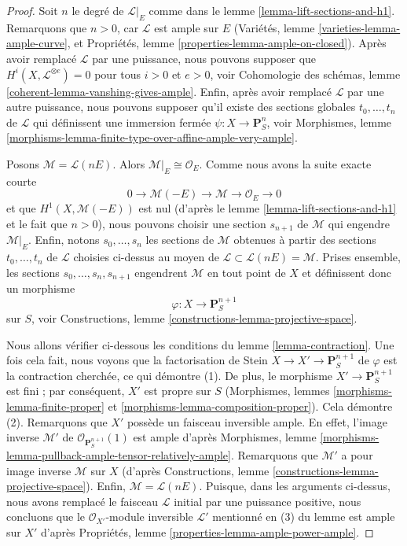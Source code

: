 \begin{proof} Soit $n$ le degré de $\mathcal{L}|_E$ comme dans le lemme \ref{lemma-lift-sections-and-h1}. Remarquons que $n > 0$, car $\mathcal{L}$ est ample sur $E$ (Variétés, lemme \ref{varieties-lemma-ample-curve}, et Propriétés, lemme \ref{properties-lemma-ample-on-closed}). Après avoir remplacé $\mathcal{L}$ par une puissance, nous pouvons supposer que $H^i(X, \mathcal{L}^{\otimes e}) = 0$ pour tous $i > 0$ et $e > 0$, voir Cohomologie des schémas, lemme \ref{coherent-lemma-vanshing-gives-ample}. Enfin, après avoir remplacé $\mathcal{L}$ par une autre puissance, nous pouvons supposer qu'il existe des sections globales $t_0, \ldots, t_n$ de $\mathcal{L}$ qui définissent une immersion fermée $\psi : X \to \mathbf{P}^n_S$, voir Morphismes, lemme \ref{morphisms-lemma-finite-type-over-affine-ample-very-ample}.

\medskip\noindent Posons $\mathcal{M} = \mathcal{L}(nE)$. Alors $\mathcal{M}|_E \cong \mathcal{O}_E$. Comme nous avons la suite exacte courte $$
0 \to \mathcal{M}(-E) \to \mathcal{M} \to \mathcal{O}_E \to 0
$$ et que $H^1(X, \mathcal{M}(-E))$ est nul (d'après le lemme \ref{lemma-lift-sections-and-h1} et le fait que $n > 0$), nous pouvons choisir une section $s_{n + 1}$ de $\mathcal{M}$ qui engendre $\mathcal{M}|_E$. Enfin, notons $s_0, \ldots, s_n$ les sections de $\mathcal{M}$ obtenues à partir des sections $t_0, \ldots, t_n$ de $\mathcal{L}$ choisies ci-dessus au moyen de $\mathcal{L} \subset \mathcal{L}(nE) = \mathcal{M}$. Prises ensemble, les sections $s_0, \ldots, s_n, s_{n + 1}$ engendrent $\mathcal{M}$ en tout point de $X$ et définissent donc un morphisme $$
\varphi : X \longrightarrow \mathbf{P}^{n + 1}_S
$$ sur $S$, voir Constructions, lemme \ref{constructions-lemma-projective-space}.

\medskip\noindent Nous allons vérifier ci-dessous les conditions du lemme \ref{lemma-contraction}. Une fois cela fait, nous voyons que la factorisation de Stein $X \to X' \to \mathbf{P}^{n + 1}_S$ de $\varphi$ est la contraction cherchée, ce qui démontre (1). De plus, le morphisme $X' \to \mathbf{P}^{n + 1}_S$ est fini ; par conséquent, $X'$ est propre sur $S$ (Morphismes, lemmes \ref{morphisms-lemma-finite-proper} et \ref{morphisms-lemma-composition-proper}). Cela démontre (2). Remarquons que $X'$ possède un faisceau inversible ample. En effet, l'image inverse $\mathcal{M}'$ de $\mathcal{O}_{\mathbf{P}^{n + 1}_S}(1)$ est ample d'après Morphismes, lemme \ref{morphisms-lemma-pullback-ample-tensor-relatively-ample}. Remarquons que $\mathcal{M}'$ a pour image inverse $\mathcal{M}$ sur $X$ (d'après Constructions, lemme \ref{constructions-lemma-projective-space}). Enfin, $\mathcal{M} = \mathcal{L}(nE)$. Puisque, dans les arguments ci-dessus, nous avons remplacé le faisceau $\mathcal{L}$ initial par une puissance positive, nous concluons que le $\mathcal{O}_{X'}$-module inversible $\mathcal{L}'$ mentionné en (3) du lemme est ample sur $X'$ d'après Propriétés, lemme \ref{properties-lemma-ample-power-ample}.


\end{proof}
